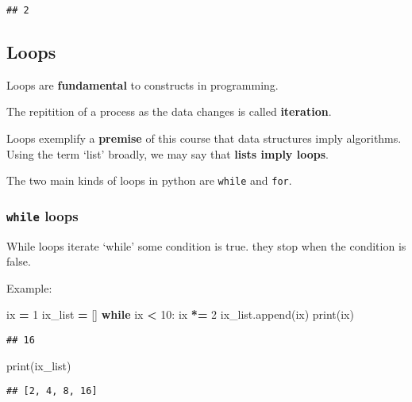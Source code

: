 \documentclass[
]{book}
\newenvironment{Shaded}{\begin{snugshade}}{\end{snugshade}}
\newcommand{\BuiltInTok}[1]{#1}
\newcommand{\ControlFlowTok}[1]{\textcolor[rgb]{0.13,0.29,0.53}{\textbf{#1}}}
\newcommand{\DecValTok}[1]{\textcolor[rgb]{0.00,0.00,0.81}{#1}}
\newcommand{\NormalTok}[1]{#1}
\newcommand{\OperatorTok}[1]{\textcolor[rgb]{0.81,0.36,0.00}{\textbf{#1}}}
\begin{document}
\begin{verbatim}
## 2
\end{verbatim}

\subsection{Loops}\label{loops}

Loops are \textbf{fundamental} to constructs in programming.

The repitition of a process as the data changes is called \textbf{iteration}.

Loops exemplify a \textbf{premise} of this course that data structures imply algorithms. Using the term `list' broadly, we may say that \textbf{lists imply loops}.

The two main kinds of loops in python are \texttt{while} and \texttt{for}.

\subsubsection{\texorpdfstring{\texttt{while} loops}{while loops}}\label{while-loops}

While loops iterate `while' some condition is true. they stop when the condition is false.

Example:

\begin{Shaded}
\begin{Highlighting}[]
\NormalTok{ix }\OperatorTok{=} \DecValTok{1}
\NormalTok{ix\_list }\OperatorTok{=}\NormalTok{ []}
\ControlFlowTok{while}\NormalTok{ ix }\OperatorTok{\textless{}} \DecValTok{10}\NormalTok{:}
\NormalTok{    ix }\OperatorTok{*=} \DecValTok{2}
\NormalTok{    ix\_list.append(ix)}
\BuiltInTok{print}\NormalTok{(ix)}
\end{Highlighting}
\end{Shaded}

\begin{verbatim}
## 16
\end{verbatim}

\begin{Shaded}
\begin{Highlighting}[]
\BuiltInTok{print}\NormalTok{(ix\_list)}
\end{Highlighting}
\end{Shaded}

\begin{verbatim}
## [2, 4, 8, 16]
\end{verbatim}
\end{document}
